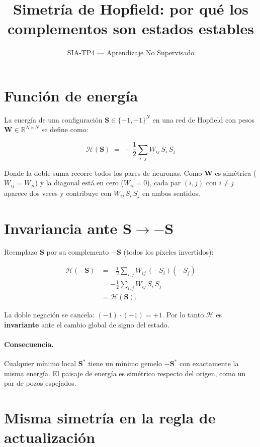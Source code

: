 \documentclass[11pt]{article}
\title{Simetría de Hopfield: por qué los complementos son estados estables}
\author{SIA-TP4 — Aprendizaje No Supervisado}
\date{}
\newcommand{\W}{\mathbf{W}}
\newcommand{\Smat}{\mathbf{S}}
\newcommand{\Hen}{\mathcal{H}}
\begin{document}
\maketitle

\section*{Función de energía}

La energía de una configuración $\Smat \in \{-1, +1\}^N$ en una red de Hopfield con pesos $\W \in \mathbb{R}^{N \times N}$ se define como:

\[
\Hen(\Smat) \;=\; -\frac{1}{2}\sum_{i,\,j} W_{ij}\, S_i\, S_j
\]

Donde la doble suma recorre todos los pares de neuronas. Como $\W$ es simétrica ($W_{ij} = W_{ji}$) y la diagonal está en cero ($W_{ii} = 0$), cada par $(i,j)$ con $i\neq j$ aparece dos veces y contribuye con $W_{ij}\, S_i\, S_j$ en ambos sentidos.

\section*{Invariancia ante $\Smat \to -\Smat$}

Reemplazo $\Smat$ por su complemento $-\Smat$ (todos los píxeles invertidos):

\begin{align*}
\Hen(-\Smat)
  &= -\frac{1}{2}\sum_{i,j} W_{ij}\,(-S_i)(-S_j) \\
  &= -\frac{1}{2}\sum_{i,j} W_{ij}\,S_i\,S_j \\
  &= \Hen(\Smat).
\end{align*}

La doble negación se cancela: $(-1)\cdot(-1) = +1$. Por lo tanto $\Hen$ es \textbf{invariante} ante el cambio global de signo del estado.

\paragraph{Consecuencia.} Cualquier mínimo local $\Smat^{*}$ tiene un mínimo gemelo $-\Smat^{*}$ con exactamente la misma energía. El paisaje de energía es simétrico respecto del origen, como un par de pozos espejados.

\section*{Misma simetría en la regla de actualización}
\end{document}
